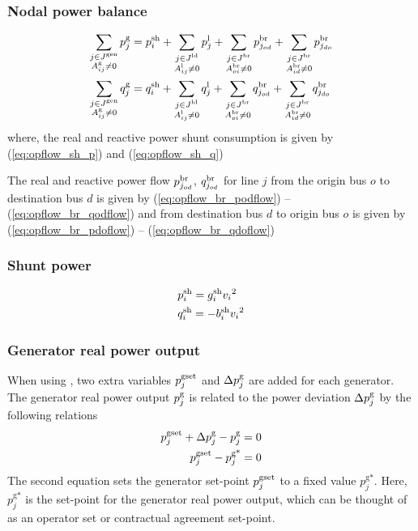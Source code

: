 \subsubsection{Nodal power balance}
\begin{align}
\sum_{\substack{j \in J^\text{gen} \\ A^{\text{g}}_{ij} \neq 0}} p^\text{g}_j &=   p^{\text{sh}}_i + \sum_{\substack{j \in J^\text{ld} \\ A^{\text{l}}_{ij} \neq 0}} p^{\text{l}}_j + \sum_{\substack{j \in J^\text{br} \\ A^{\text{br}}_{oi} \neq 0}} p^\text{br}_{j_{od}} + \sum_{\substack{j \in J^\text{br} \\ A^{\text{br}}_{id} \neq 0}} p^\text{br}_{j_{do}} \\
\sum_{\substack{j \in J^\text{gen} \\ A^{\text{g}}_{ij} \neq 0}} q^\text{g}_j &=  q^{\text{sh}}_i + \sum_{\substack{j \in J^\text{ld} \\ A^{\text{l}}_{ij} \neq 0}} q^{\text{l}}_j +
\sum_{\substack{j \in J^\text{br} \\ A^{\text{br}}_{oi} \neq 0}} q^\text{br}_{j_{od}} + \sum_{\substack{j \in J^\text{br} \\ A^{\text{br}}_{id} \neq 0}} q^\text{br}_{j_{do}} \\
\end{align}
where, the real and reactive power shunt consumption is given by (\ref{eq:opflow_sh_p}) and (\ref{eq:opflow_sh_q})


The real and reactive power flow $p^\text{br}_{j_{od}}$, $q^\text{br}_{j_{od}}$ for line $j$ from the origin bus $o$ to destination bus $d$ is given by (\ref{eq:opflow_br_podflow}) -- 
 (\ref{eq:opflow_br_qodflow})
and from destination bus $d$ to origin bus $o$ is given by (\ref{eq:opflow_br_pdoflow}) -- 
 (\ref{eq:opflow_br_qdoflow})

 \subsubsection{Shunt power}
\begin{align}
&p^{\text{sh}}_i = g^\text{sh}_i{v_i}^2 \label{eq:opflow_sh_p} \\
&q^{\text{sh}}_i = -b^\text{sh}_i{v_i}^2 \label{eq:opflow_sh_q}
\end{align}

\subsubsection{Generator real power output}

When using \option{\opflowgensetpoint}, two extra variables $p^{\text{gset}}_j$ and $\Delta{p}^\text{g}_j$ are added for each generator. The generator real power output $p^\text{g}_j$ is related to the power deviation $\Delta{p}^\text{g}_j$ by the following relations
\begin{align}
  p^{\text{gset}}_j + \Delta{p}^\text{g}_j - p^\text{g}_j = 0 \\
  p^{\text{gset}}_j - p^{\text{g*}}_j = 0
\end{align}
The second equation sets the generator set-point $p^{\text{gset}}_j$ to a fixed value $p^{\text{g*}}_j$. Here, $p^{\text{g*}}_j$ is the set-point for the generator real power output, which can be thought of as an operator set or contractual agreement set-point.

